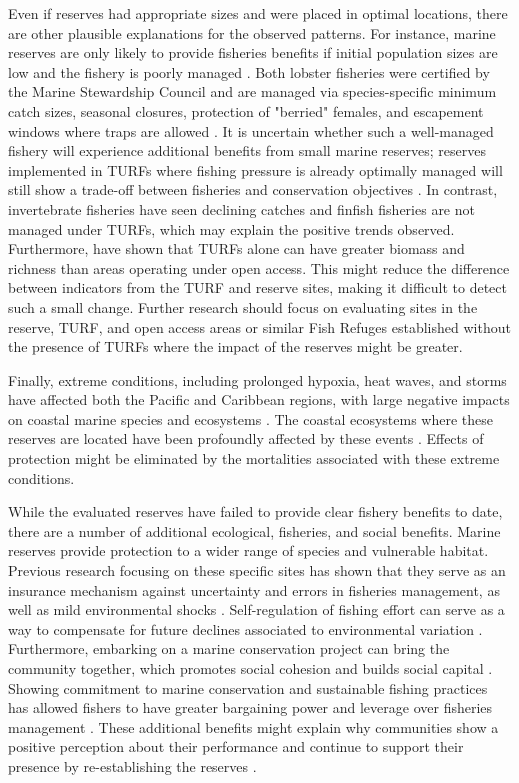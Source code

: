 \documentclass[10pt,letterpaper]{article}
\begin{document}
Even if reserves had appropriate sizes and were placed in optimal locations, there are other plausible explanations for the observed patterns. For instance, marine reserves are only likely to provide fisheries benefits if initial population sizes are low and the fishery is poorly managed \cite{hilborn_2004,hilborn_2006}. Both lobster fisheries were certified by the Marine Stewardship Council and are managed via species-specific minimum catch sizes, seasonal closures, protection of "berried" females, and escapement windows where traps are allowed \cite{dof_website_1993}. It is uncertain whether such a well-managed fishery will experience additional benefits from small marine reserves; reserves implemented in TURFs where fishing pressure is already optimally managed will still show a trade-off between fisheries and conservation objectives \cite{lester_2017}. In contrast, invertebrate fisheries have seen declining catches and finfish fisheries are not managed under TURFs, which may explain the positive trends observed. Furthermore, \cite{gelcich_2008} have shown that TURFs alone can have greater biomass and richness than areas operating under open access. This might reduce the difference between indicators from the TURF and reserve sites, making it difficult to detect such a small change. Further research should focus on evaluating sites in the reserve, TURF, and open access areas or similar Fish Refuges established without the presence of TURFs where the impact of the reserves might be greater.

Finally, extreme conditions, including prolonged hypoxia, heat waves, and storms have affected both the Pacific and Caribbean regions, with large negative impacts on coastal marine species and ecosystems \cite{cavole_2016,hughes_2018,breitburg_2018}. The coastal ecosystems where these reserves are located have been profoundly affected by these events \cite{micheli_2012-EU,woodson_2018}. Effects of protection might be eliminated by the mortalities associated with these extreme conditions.

While the evaluated reserves have failed to provide clear fishery benefits to date, there are a number of additional ecological, fisheries, and social benefits. Marine reserves provide protection to a wider range of species and vulnerable habitat. Previous research focusing on these specific sites has shown that they serve as an insurance mechanism against uncertainty and errors in fisheries management, as well as mild environmental shocks \cite{micheli_2012-EU,deleo_2015,roberts_2017-J9,aalto}. Self-regulation of fishing effort can serve as a way to compensate for future declines associated to environmental variation \cite{finkbeiner_2018}. Furthermore, embarking on a marine conservation project can bring the community together, which promotes social cohesion and builds social capital \cite{fulton_2019}. Showing commitment to marine conservation and sustainable fishing practices has allowed fishers to have greater bargaining power and leverage over fisheries management \cite{prezramrez_2012}. These additional benefits might explain why communities show a positive perception about their performance and continue to support their presence by re-establishing the reserves \cite{ayer_2018}.
\end{document}
